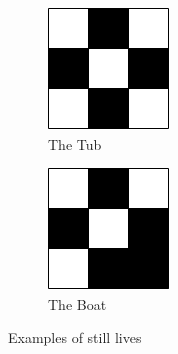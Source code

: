 \documentclass{l4proj}
\begin{document}
\begin{figure}[h]
\begin{subfigure}[b]{0.2\textwidth}
    \includegraphics[width=\textwidth]{dissertation/images/gol_structures/still_life_2.png} 
    \caption{The Tub}
    \label{fig:subim1}
\end{subfigure}
\hfill
\begin{subfigure}[b]{0.2\textwidth}
    \includegraphics[width=\textwidth]{dissertation/images/gol_structures/still_life_3.png} 
    \caption{The Boat}
    \label{fig:subim1}
\end{subfigure}

\caption{Examples of still lives}
\end{figure}
\end{document}
